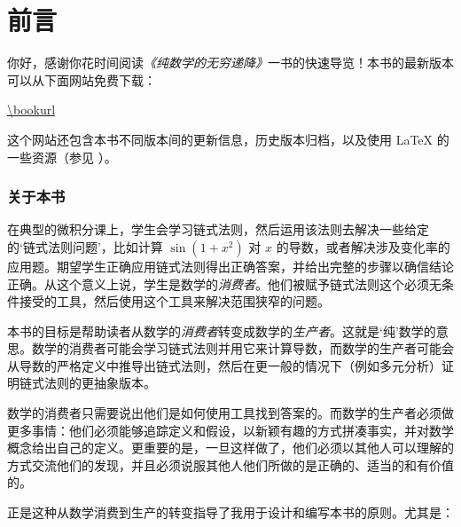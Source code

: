 \chapter*{前言}

你好，感谢你花时间阅读\textit{《纯数学的无穷递降》}一书的快速导览！本书的最新版本可以从下面网站免费下载：
\begin{center} \vspace{-10pt}
\url{\bookurl}
\end{center} \vspace{-10pt}
这个网站还包含本书不同版本间的更新信息，历史版本归档，以及使用 \LaTeX{} 的一些资源（参见 ）。

\subsection*{关于本书}

在典型的微积分课上，学生会学习链式法则，然后运用该法则去解决一些给定的`链式法则问题'，比如计算 $\sin(1+x^2)$ 对 $x$ 的导数，或者解决涉及变化率的应用题。期望学生正确应用链式法则得出正确答案，并给出完整的步骤以确信结论正确。从这个意义上说，学生是数学的\textit{消费者}。他们被赋予链式法则这个必须无条件接受的工具，然后使用这个工具来解决范围狭窄的问题。

本书的目标是帮助读者从数学的\textit{消费者}转变成数学的\textit{生产者}。这就是`纯'数学的意思。数学的消费者可能会学习链式法则并用它来计算导数，而数学的生产者可能会从导数的严格定义中推导出链式法则，然后在更一般的情况下（例如多元分析）证明链式法则的更抽象版本。

数学的消费者只需要说出他们是如何使用工具找到答案的。而数学的生产者必须做更多事情：他们必须能够追踪定义和假设，以新颖有趣的方式拼凑事实，并对数学概念给出自己的定义。更重要的是，一旦这样做了，他们必须以其他人可以理解的方式交流他们的发现，并且必须说服其他人他们所做的是正确的、适当的和有价值的。

正是这种从数学消费到生产的转变指导了我用于设计和编写本书的原则。尤其是：


